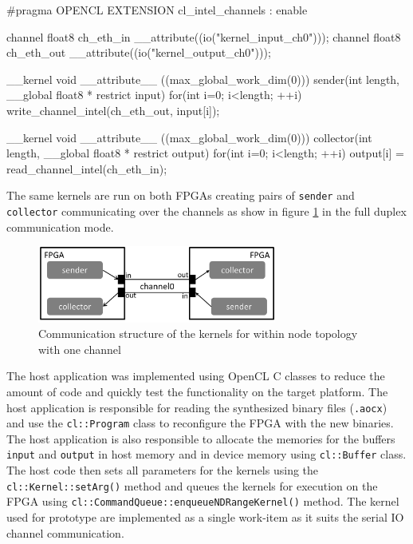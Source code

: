\begin{CppCode} [caption=Kernels for within node prototype, frame=tlrb, label=code:within_node]
#pragma OPENCL EXTENSION cl_intel_channels : enable

channel float8 ch_eth_in __attribute((io("kernel_input_ch0")));
channel float8 ch_eth_out __attribute((io("kernel_output_ch0")));

__kernel void __attribute__ ((max_global_work_dim(0)))
sender(int length, __global float8 * restrict input)
{
    for(int i=0; i<length; ++i)
        write_channel_intel(ch_eth_out, input[i]);
}

__kernel void __attribute__ ((max_global_work_dim(0)))
collector(int length, __global float8 * restrict output)
{
    for(int i=0; i<length; ++i)
        output[i] = read_channel_intel(ch_eth_in);
}
\end{CppCode}

The same kernels are run on both FPGAs creating pairs of \texttt{sender}
and \texttt{collector} communicating over the channels as show in
figure \ref{fig:send_rcv} in the full duplex communication mode.

\begin{figure}[h]%
    \centering
    \includegraphics[width=0.7\textwidth]{images/send_recv}
    \caption{Communication structure of the kernels for within node topology with one channel}
    \label{fig:send_rcv}
\end{figure}

The host application was implemented using OpenCL C\+\+ classes to reduce the amount
of code and quickly test the functionality on the target platform. The host application
is responsible for reading the synthesized binary files (\texttt{.aocx}) and use the 
\texttt{cl::Program} class to reconfigure the FPGA with the new binaries. The host application
is also responsible to allocate the memories for the buffers \texttt{input} and
\texttt{output} in host memory and in device memory using \texttt{cl::Buffer} class.
The host code then sets all parameters for the kernels using the \texttt{cl::Kernel::setArg()}
method and queues the kernels for execution on the FPGA using \texttt{cl::CommandQueue::enqueueNDRangeKernel()}
method. The kernel used for prototype are implemented as a single work-item as it suits the 
serial IO channel communication.



